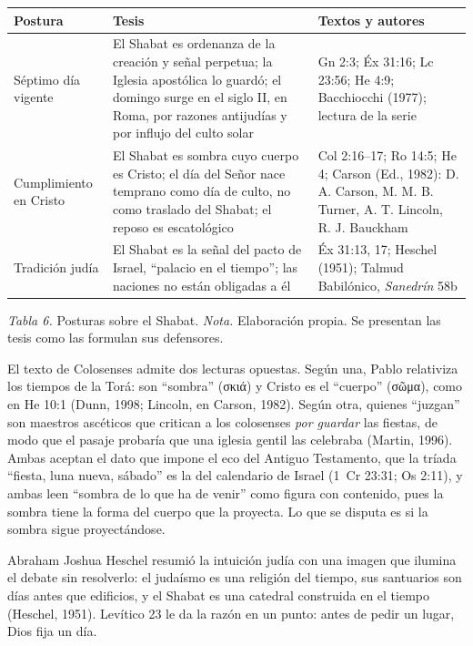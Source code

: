 \documentclass[11pt,letterpaper]{article}
\newcommand{\grc}[1]{\foreignlanguage{ancientgreek}{#1}}
\begin{document}
\begin{center}\small\renewcommand{\arraystretch}{1.2}
\begin{tabular}{@{}L{3.0cm}L{6.4cm}L{5.8cm}@{}}
\toprule
\textbf{Postura} & \textbf{Tesis} & \textbf{Textos y autores} \\ \midrule
Séptimo día vigente & El Shabat es ordenanza de la creación y señal perpetua; la Iglesia apostólica lo guardó; el domingo surge en el siglo II, en Roma, por razones antijudías y por influjo del culto solar & Gn 2:3; Éx 31:16; Lc 23:56; He 4:9; Bacchiocchi (1977); lectura de la serie \\
Cumplimiento en Cristo & El Shabat es sombra cuyo cuerpo es Cristo; el día del Señor nace temprano como día de culto, no como traslado del Shabat; el reposo es escatológico & Col 2:16--17; Ro 14:5; He 4; Carson (Ed., 1982): D. A. Carson, M. M. B. Turner, A. T. Lincoln, R. J. Bauckham \\
Tradición judía & El Shabat es la señal del pacto de Israel, ``palacio en el tiempo''; las naciones no están obligadas a él & Éx 31:13, 17; Heschel (1951); Talmud Babilónico, \emph{Sanedrín} 58b \\
\bottomrule
\end{tabular}\par
{\footnotesize\color{sepia}\textit{Tabla 6.} Posturas sobre el Shabat. \textit{Nota.} Elaboración propia. Se presentan las tesis como las formulan sus defensores.}
\end{center}

El texto de Colosenses admite dos lecturas opuestas. Según una, Pablo relativiza los tiempos de la Torá: son ``sombra'' (\grc{σκιά}) y Cristo es el ``cuerpo'' (\grc{σῶμα}), como en He 10:1 (Dunn, 1998; Lincoln, en Carson, 1982). Según otra, quienes ``juzgan'' son maestros ascéticos que critican a los colosenses \emph{por guardar} las fiestas, de modo que el pasaje probaría que una iglesia gentil las celebraba (Martin, 1996). Ambas aceptan el dato que impone el eco del Antiguo Testamento, que la tríada ``fiesta, luna nueva, sábado'' es la del calendario de Israel (1~Cr 23:31; Os 2:11), y ambas leen ``sombra de lo que ha de venir'' como figura con contenido, pues la sombra tiene la forma del cuerpo que la proyecta. Lo que se disputa es si la sombra sigue proyectándose.

Abraham Joshua Heschel resumió la intuición judía con una imagen que ilumina el debate sin resolverlo: el judaísmo es una religión del tiempo, sus santuarios son días antes que edificios, y el Shabat es una catedral construida en el tiempo (Heschel, 1951). Levítico 23 le da la razón en un punto: antes de pedir un lugar, Dios fija un día.
\end{document}
